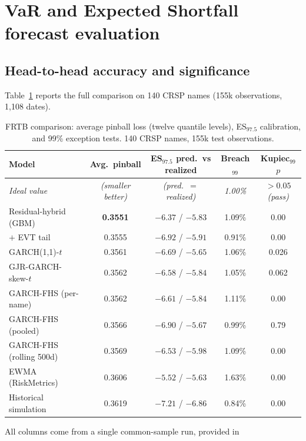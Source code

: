 \documentclass[11pt]{article}
\theoremstyle{remark}
\begin{document}
\section{VaR and Expected Shortfall forecast evaluation}\label{sec:frtb}

\subsection{Head-to-head accuracy and significance}

Table~\ref{tab:frtb} reports the full comparison on 140 CRSP names (155k observations, 1{,}108 dates).

\begin{table}[t]
\centering
\begin{threeparttable}
\caption{FRTB comparison: average pinball loss (twelve quantile levels),
ES$_{97.5}$ calibration, and 99\% exception tests. 140 CRSP names, 155k
test observations.}
\label{tab:frtb}
\small\setlength{\tabcolsep}{4.5pt}
\begin{tabular}{lcccc}
\toprule
Model & Avg.\ pinball & ES$_{97.5}$ pred.\ vs realized & Breach$_{99}$ & Kupiec$_{99}$ $p$ \\
\midrule
\emph{Ideal value} & \emph{(smaller better)} & \emph{(pred.\ $=$ realized)} & \emph{1.00\%} & \emph{$>0.05$ (pass)} \\
\midrule
Residual-hybrid (GBM) & \textbf{0.3551} & $-6.37$ / $-5.83$ & 1.09\% & 0.00 \\
\quad $+$ EVT tail & 0.3555 & $-6.92$ / $-5.91$ & 0.91\% & 0.00 \\
GARCH(1,1)-$t$ & 0.3561 & $-6.69$ / $-5.65$ & 1.06\% & 0.026 \\
GJR-GARCH-skew-$t$ & 0.3562 & $-6.58$ / $-5.84$ & 1.05\% & 0.062 \\
GARCH-FHS (per-name) & 0.3562 & $-6.61$ / $-5.84$ & 1.11\% & 0.00 \\
GARCH-FHS (pooled) & 0.3566 & $-6.90$ / $-5.67$ & 0.99\% & 0.79 \\
GARCH-FHS (rolling 500d) & 0.3569 & $-6.53$ / $-5.98$ & 1.09\% & 0.00 \\
EWMA (RiskMetrics) & 0.3606 & $-5.52$ / $-5.63$ & 1.63\% & 0.00 \\
Historical simulation & 0.3619 & $-7.21$ / $-6.86$ & 0.84\% & 0.00 \\
\bottomrule
\end{tabular}
\begin{tablenotes}\footnotesize
\item All columns come from a single common-sample run, provided in

\end{tablenotes}
\end{threeparttable}
\end{table}
\end{document}
